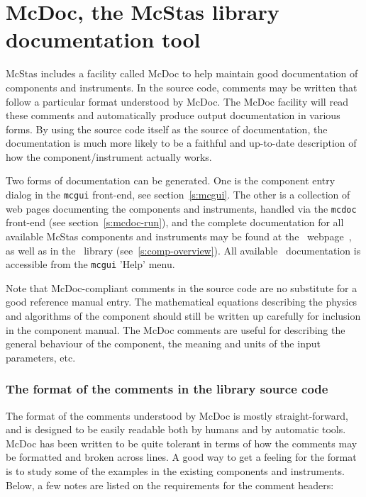 \section{McDoc, the McStas library documentation tool}
\label{s:mcdoc}

McStas includes a facility called McDoc to help maintain good documentation of
components and instruments. In the source code, comments may be
written that follow a particular format understood by McDoc. The McDoc facility
will read these comments and automatically produce output documentation in
various forms. By using the source code itself as the source of documentation,
the documentation is much more likely to be a faithful and up-to-date
description of how the component/instrument actually works.

Two forms of documentation can be generated. One
is the component entry dialog in the \verb+mcgui+ front-end, see
section~\ref{s:mcgui}. The other is a collection of web pages documenting
the components and instruments, handled via the \verb+mcdoc+ front-end (see section~\ref{s:mcdoc-run}), and the complete documentation for all available
McStas components and instruments may be found at the \MCS\
webpage~\cite{mcstas_webpage}, as well as in the \MCS\ library
(see~\ref{s:comp-overview}). All available \MCS\ documentation is accessible from the \verb+mcgui+ 'Help' menu.

Note that McDoc-compliant comments in the source code are no substitute
for a good reference manual entry. The mathematical equations describing
the physics and algorithms of the component should still be written up
carefully for inclusion in the component manual. The McDoc comments are
useful for describing the general behaviour of the component, the
meaning and units of the input parameters, etc.


\subsubsection{The format of the comments in the library source code}

The format of the comments understood by McDoc is mostly
straight-forward, and is designed to be easily readable both by humans
and by automatic tools. McDoc has been written to be quite tolerant in
terms of how the comments may be formatted and broken across lines. A
good way to get a feeling for the format is to study some of the examples
in the existing components and instruments. Below, a few
notes are listed on the requirements for the comment headers:

